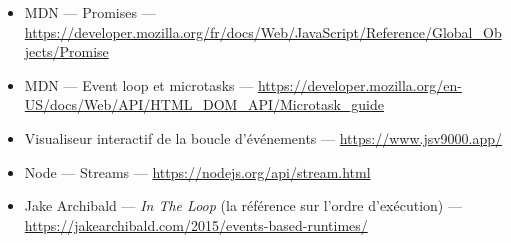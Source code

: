 \begin{ressources}
\begin{itemize}
  \item MDN --- Promises --- \url{https://developer.mozilla.org/fr/docs/Web/JavaScript/Reference/Global_Objects/Promise}
  \item MDN --- Event loop et microtasks --- \url{https://developer.mozilla.org/en-US/docs/Web/API/HTML_DOM_API/Microtask_guide}
  \item Visualiseur interactif de la boucle d'\'ev\'enements --- \url{https://www.jsv9000.app/}
  \item Node --- Streams --- \url{https://nodejs.org/api/stream.html}
  \item Jake Archibald --- \emph{In The Loop} (la r\'ef\'erence sur l'ordre d'ex\'ecution) --- \url{https://jakearchibald.com/2015/events-based-runtimes/}
\end{itemize}
\end{ressources}

